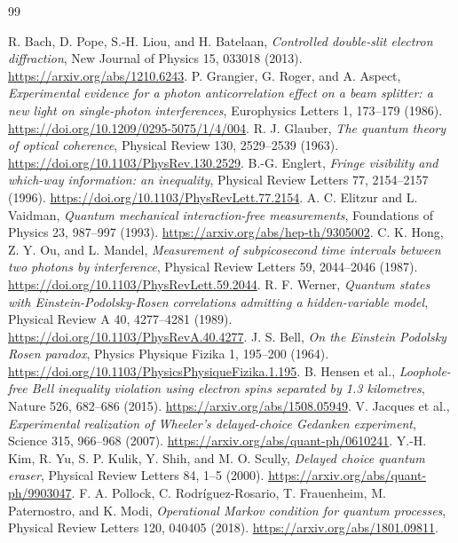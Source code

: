 \documentclass[11pt,a4paper]{article}
\begin{document}
\begin{thebibliography}{99}
\raggedright
{}
R. Bach, D. Pope, S.-H. Liou, and H. Batelaan,
\emph{Controlled double-slit electron diffraction},
New Journal of Physics 15, 033018 (2013).
\url{https://arxiv.org/abs/1210.6243}.
P. Grangier, G. Roger, and A. Aspect,
\emph{Experimental evidence for a photon anticorrelation effect on a beam
splitter: a new light on single-photon interferences},
Europhysics Letters 1, 173--179 (1986).
\url{https://doi.org/10.1209/0295-5075/1/4/004}.
R. J. Glauber, \emph{The quantum theory of optical coherence},
Physical Review 130, 2529--2539 (1963).
\url{https://doi.org/10.1103/PhysRev.130.2529}.
B.-G. Englert, \emph{Fringe visibility and which-way information: an inequality},
Physical Review Letters 77, 2154--2157 (1996).
\url{https://doi.org/10.1103/PhysRevLett.77.2154}.
A. C. Elitzur and L. Vaidman, \emph{Quantum mechanical interaction-free
measurements}, Foundations of Physics 23, 987--997 (1993).
\url{https://arxiv.org/abs/hep-th/9305002}.
C. K. Hong, Z. Y. Ou, and L. Mandel,
\emph{Measurement of subpicosecond time intervals between two photons by
interference}, Physical Review Letters 59, 2044--2046 (1987).
\url{https://doi.org/10.1103/PhysRevLett.59.2044}.
R. F. Werner, \emph{Quantum states with Einstein-Podolsky-Rosen correlations
admitting a hidden-variable model}, Physical Review A 40, 4277--4281 (1989).
\url{https://doi.org/10.1103/PhysRevA.40.4277}.
J. S. Bell, \emph{On the Einstein Podolsky Rosen paradox},
Physics Physique Fizika 1, 195--200 (1964).
\url{https://doi.org/10.1103/PhysicsPhysiqueFizika.1.195}.
B. Hensen et al., \emph{Loophole-free Bell inequality violation using
electron spins separated by 1.3 kilometres}, Nature 526, 682--686 (2015).
\url{https://arxiv.org/abs/1508.05949}.
V. Jacques et al., \emph{Experimental realization of Wheeler's delayed-choice
Gedanken experiment}, Science 315, 966--968 (2007).
\url{https://arxiv.org/abs/quant-ph/0610241}.
Y.-H. Kim, R. Yu, S. P. Kulik, Y. Shih, and M. O. Scully,
\emph{Delayed choice quantum eraser},
Physical Review Letters 84, 1--5 (2000).
\url{https://arxiv.org/abs/quant-ph/9903047}.
F. A. Pollock, C. Rodr\'iguez-Rosario, T. Frauenheim, M. Paternostro,
and K. Modi, \emph{Operational Markov condition for quantum processes},
Physical Review Letters 120, 040405 (2018).
\url{https://arxiv.org/abs/1801.09811}.

\end{thebibliography}
\end{document}

